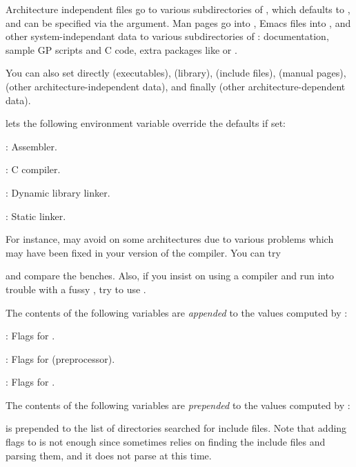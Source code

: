 Architecture independent files go to various subdirectories of
, which defaults to , and can be
specified via the  argument. Man pages go into
, Emacs files into
, and other system-independant data
to various subdirectories of : documentation,
sample GP scripts and C code, extra packages like  or
.

\noindent You can also set directly  (executables),
 (library),  (include files), 
(manual pages),  (other architecture-independent data), and
finally  (other architecture-dependent data).

  lets the following environment
variable override the defaults if set:

: Assembler.

: C compiler.

: Dynamic library linker.

: Static linker.

\noindent For instance,  may avoid  on some
architectures due to various problems which may have been fixed in your
version of the compiler. You can try


\noindent and compare the benches. Also, if you insist on using a 
compiler and run into trouble with a fussy , try to use
.


\noindent The contents of the following variables are \emph{appended} to the
values computed by :

: Flags for .

: Flags for  (preprocessor).

: Flags for .

\noindent The contents of the following variables are \emph{prepended} to
the values computed by :

 is prepended to the list of directories
searched for include files. Note that adding  flags to
 is not enough since  sometimes
relies on finding the include files and parsing them, and it does not 
parse  at this time.


